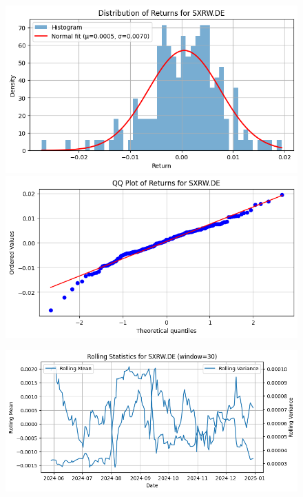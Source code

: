 \documentclass{article}%
\begin{document}
\begin{figure}[htbp]%
\begin{minipage}{0.49\textwidth}%
\includegraphics[width=\linewidth]{ticker_images/SXRW.DE_return_distribution.png}%
\end{minipage}%
\begin{minipage}{0.49\textwidth}%
\includegraphics[width=\linewidth]{ticker_images/SXRW.DE_qq_plot.png}%
\end{minipage}%
\end{figure}

%


\begin{figure}[htbp]%
\begin{minipage}{0.49\textwidth}%
\includegraphics[width=\linewidth]{ticker_images/SXRW.DE_rolling_stats.png}%
\end{minipage}%
\end{figure}
\end{document}
